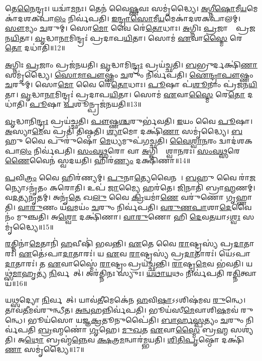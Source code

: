 𑌤𑍇\ul{𑌨𑍈}𑌨𑍍𑌦𑍍𑌰𑌃।
𑌯𑌦𑍍𑌵𑌾॑\ul{𑌮}𑌨𑌃।
𑌤𑍇𑌨॑ 𑌵𑍈\ul{𑌷𑍍𑌣}𑌵𑌃 𑌸𑌮𑍃॑𑌦𑍍𑌧𑍍𑌯𑍈।
\ul{𑌅}\ul{𑌗𑍍𑌨𑍀}\ul{𑌷𑍋}𑌮𑍀\ul{𑌯}𑌮𑍇𑌕𑌾॑\-𑌦𑌶𑌕𑌪𑌾\ul{𑌲𑌂} 𑌨𑌿𑌰𑍍𑌵॑𑌪𑌤𑌿।
\ul{𑌇}\ul{𑌨𑍍𑌦𑍍𑌰𑌾}\ul{𑌸𑍋}𑌮𑍀\ul{𑌯}𑌮𑍇𑌕𑌾॑𑌦𑌶𑌕𑌪𑌾𑌲𑌮𑍍।
\ul{𑌸𑍗}𑌮𑍍𑌯𑌂 \ul{𑌚}𑌰𑍁𑌮𑍍।
𑌸𑍋\ul{𑌮𑍋} 𑌵𑍈 𑌰𑍇॑\ul{𑌤𑍋}𑌧𑌾𑌃।
\ul{𑌅}𑌗𑍍𑌨𑌿𑌃 \ul{𑌪𑍍𑌰}𑌜𑌾𑌨𑌾𑌂᳚ 𑌪𑍍𑌰𑌜𑌨\ul{𑌯𑌿}𑌤𑌾।
\ul{𑌵𑍃}𑌦𑍍𑌧𑌾\ul{𑌨𑌾}𑌮𑌿𑌨𑍍𑌦𑍍𑌰𑌃॑ 𑌪𑍍𑌰𑌦𑌾𑌪\ul{𑌯𑌿}𑌤𑌾।
𑌸𑍋𑌮॑ \ul{𑌏}𑌵𑌾\ul{𑌸𑍍𑌮𑍈} 𑌰𑍇\ul{𑌤𑍋} 𑌦𑌧𑌾॑𑌤𑌿॥12॥

\ul{𑌅}𑌗𑍍𑌨𑌿𑌃 \ul{𑌪𑍍𑌰}𑌜𑌾𑌂 𑌪𑍍𑌰𑌜॑𑌨𑌯𑌤𑌿।
\ul{𑌵𑍃}𑌦𑍍𑌧𑌾𑌮𑌿\ul{𑌨𑍍𑌦𑍍𑌰𑌃} 𑌪𑍍𑌰𑌯॑𑌚𑍍𑌛𑌤𑌿।
\ul{𑌬}𑌭𑍍𑌰𑍁𑌰𑍍𑌦𑌕𑍍𑌷𑌿॑\ul{𑌣𑌾} 𑌸𑌮𑍃॑𑌦𑍍𑌧𑍍𑌯𑍈।
\ul{𑌸𑍋}\ul{𑌮𑌾}\ul{𑌪𑍗}𑌷𑍍𑌣𑌂 \ul{𑌚}𑌰𑍁𑌂 𑌨𑌿𑌰𑍍𑌵॑𑌪𑌤𑌿।
\ul{𑌐}\ul{𑌨𑍍𑌦𑍍𑌰𑌾}\ul{𑌪𑍗}𑌷𑍍𑌣𑌂 \ul{𑌚}𑌰𑍁𑌮𑍍।
𑌸𑍋\ul{𑌮𑍋} 𑌵𑍈 𑌰𑍇॑\ul{𑌤𑍋}𑌧𑌾𑌃।
\ul{𑌪𑍂}𑌷𑌾 𑌪॑\ul{𑌶𑍂}𑌨𑌾𑌂 𑌪𑍍𑌰॑𑌜𑌨\ul{𑌯𑌿}𑌤𑌾।
\ul{𑌵𑍃}𑌦𑍍𑌧𑌾\ul{𑌨𑌾}𑌮𑌿𑌨𑍍𑌦𑍍𑌰𑌃॑ 𑌪𑍍𑌰𑌦𑌾𑌪\ul{𑌯𑌿}𑌤𑌾।
𑌸𑍋𑌮॑ \ul{𑌏}𑌵𑌾\ul{𑌸𑍍𑌮𑍈} 𑌰𑍇\ul{𑌤𑍋} 𑌦𑌧𑌾॑𑌤𑌿।
\ul{𑌪𑍂}𑌷𑌾 \ul{𑌪}𑌶𑍂𑌨𑍍𑌪𑍍𑌰𑌜॑𑌨𑌯𑌤𑌿॥13॥

\ul{𑌵𑍃}𑌦𑍍𑌧𑌾𑌨𑌿\ul{𑌨𑍍𑌦𑍍𑌰𑌃} 𑌪𑍍𑌰𑌯॑𑌚𑍍𑌛𑌤𑌿।
\ul{𑌪𑍗}𑌷𑍍𑌣\ul{𑌶𑍍𑌚}𑌰𑍁𑌰𑍍𑌭॑𑌵𑌤𑌿।
\ul{𑌇}𑌯𑌂 𑌵𑍈 \ul{𑌪𑍂}𑌷𑌾।
\ul{𑌅}𑌸𑍍𑌯𑌾\ul{𑌮𑍇}𑌵 𑌪𑍍𑌰𑌤𑌿॑ 𑌤𑌿𑌷𑍍𑌠𑌤𑌿।
\ul{𑌶𑍍𑌯𑌾}𑌮𑍋 𑌦𑌕𑍍𑌷𑌿॑\ul{𑌣𑌾} 𑌸𑌮𑍃॑𑌦𑍍𑌧𑍍𑌯𑍈।
\ul{𑌬}𑌹𑍁 𑌵𑍈 𑌪𑍁𑌰𑍁॑𑌷𑍋 \ul{𑌮𑍇}𑌧𑍍𑌯𑌮𑍁𑌪॑𑌗𑌚𑍍𑌛𑌤𑌿।
\ul{𑌵𑍈}\ul{𑌶𑍍𑌵𑌾}\ul{𑌨}𑌰𑌂 𑌦𑍍𑌵𑌾𑌦॑𑌶𑌕𑌪𑌾\ul{𑌲𑌂} 𑌨𑌿𑌰𑍍𑌵॑𑌪𑌤𑌿।
\ul{𑌸𑌂}\ul{𑌵}\ul{𑌥𑍍𑌸}𑌰𑍋 𑌵𑌾 \ul{𑌅}𑌗𑍍𑌨𑌿𑌰𑍍𑌵𑍈᳚𑌶𑍍𑌵𑌾\ul{𑌨}𑌰𑌃।
\ul{𑌸𑌂}\ul{𑌵}\ul{𑌥𑍍𑌸}𑌰𑍇\ul{𑌣𑍈}𑌵𑍈𑌨॑ 𑌸𑍍𑌵𑌦𑌯𑌤𑌿।
𑌹𑌿𑌰॑\ul{𑌣𑍍𑌯𑌂} 𑌦𑌕𑍍𑌷𑌿॑𑌣𑌾॥14॥

\ul{𑌪}𑌵𑌿\ul{𑌤𑍍𑌰𑌂} 𑌵𑍈 𑌹𑌿𑌰॑𑌣𑍍𑌯𑌮𑍍।
\ul{𑌪𑍁}𑌨𑌾\ul{𑌤𑍍𑌯𑍇}𑌵𑍈𑌨𑌮𑍍᳚।
\ul{𑌬}𑌹𑍁 𑌵𑍈 𑌰𑌾॑\ul{𑌜}𑌨𑍍𑌯𑍋\-𑌽𑌨𑍃॑𑌤𑌂 𑌕𑌰𑍋𑌤𑌿।
𑌉𑌪॑ \ul{𑌜𑌾}𑌮𑍍𑌯𑍈 𑌹𑌰॑𑌤𑍇।
\ul{𑌜𑌿}𑌨𑌾𑌤𑌿॑ 𑌬𑍍𑌰𑌾\ul{𑌹𑍍𑌮}𑌣𑌮𑍍।
𑌵\ul{𑌦}𑌤𑍍𑌯𑌨𑍃॑𑌤𑌮𑍍।
𑌅𑌨𑍃॑\ul{𑌤𑍇} 𑌖\ul{𑌲𑍁} 𑌵𑍈 \ul{𑌕𑍍𑌰𑌿}𑌯𑌮𑌾॑\ul{𑌣𑍇} 𑌵𑌰𑍁॑𑌣𑍋 𑌗𑍃𑌹𑍍𑌣𑌾𑌤𑌿।
\ul{𑌵𑌾}\ul{𑌰𑍁}𑌣𑌂 𑌯॑\ul{𑌵}𑌮𑌯𑌂॑ \ul{𑌚}𑌰𑍁𑌂 𑌨𑌿𑌰𑍍𑌵॑𑌪𑌤𑌿।
\ul{𑌵}\ul{𑌰𑍁}\ul{𑌣}\ul{𑌪𑌾}𑌶𑌾\ul{𑌦𑍇}𑌵𑍈𑌨𑌂॑ 𑌮𑍁𑌞𑍍𑌚𑌤𑌿।
𑌅\ul{𑌶𑍍𑌵𑍋} 𑌦𑌕𑍍𑌷𑌿॑𑌣𑌾।
\ul{𑌵𑌾}\ul{𑌰𑍁}𑌣𑍋 𑌹𑌿 \ul{𑌦𑍇}𑌵\ul{𑌤}𑌯𑌾\-𑌽\ul{𑌶𑍍𑌵𑌃} 𑌸𑌮𑍃॑𑌦𑍍𑌧𑍍𑌯𑍈॥15॥\anuvakamend[\ul{𑌐}\ul{𑌨𑍍𑌦𑍍𑌰𑌾}\ul{𑌵𑍈}\ul{𑌷𑍍𑌣}𑌵𑌮𑍇𑌕𑌾॑𑌦𑌶𑌕𑌪𑌾\ul{𑌲𑌂} 𑌯𑌦𑍃॑\ul{𑌷}𑌭𑍋 𑌦𑌧𑌾॑𑌤𑌿 \ul{𑌪𑍂}𑌷𑌾 \ul{𑌪}𑌶𑍂𑌨𑍍𑌪𑍍𑌰𑌜॑𑌨𑌯\ul{𑌤𑌿} 𑌹𑌿𑌰॑\ul{𑌣𑍍𑌯𑌂} 𑌦𑌕𑍍𑌷𑌿॑\ul{𑌣𑌾} 𑌦\ul{𑌕𑍍𑌷𑌿}𑌣𑍈𑌕𑌂॑ 𑌚]

\ul{𑌰}𑌤𑍍𑌨𑌿𑌨𑌾॑\ul{𑌮𑍇}𑌤𑌾𑌨𑌿॑ \ul{𑌹}𑌵𑍀𑌷𑌿॑ 𑌭𑌵𑌨𑍍𑌤𑌿।
\ul{𑌏}𑌤𑍇 𑌵𑍈 \ul{𑌰𑌾}𑌷𑍍𑌟𑍍𑌰𑌸𑍍𑌯॑ 𑌪𑍍𑌰\ul{𑌦𑌾}𑌤𑌾𑌰𑌃॑।
\ul{𑌏}𑌤𑍇॑\-𑌽𑌪𑌾\ul{𑌦𑌾}𑌤𑌾𑌰𑌃॑।
𑌯 \ul{𑌏}𑌵 \ul{𑌰𑌾}𑌷𑍍𑌟𑍍𑌰𑌸𑍍𑌯॑ 𑌪𑍍𑌰\ul{𑌦𑌾}𑌤𑌾𑌰𑌃॑।
𑌯𑍇॑𑌽𑌪𑌾\ul{𑌦𑌾}𑌤𑌾𑌰𑌃॑।
𑌤 \ul{𑌏}𑌵𑌾𑌸𑍍𑌮𑍈॑ \ul{𑌰𑌾}𑌷𑍍𑌟𑍍𑌰𑌂 𑌪𑍍𑌰𑌯॑𑌚𑍍𑌛𑌨𑍍𑌤𑌿।
\ul{𑌰𑌾}𑌷𑍍𑌟𑍍𑌰\ul{𑌮𑍇}𑌵 𑌭॑𑌵𑌤𑌿।
𑌯𑌥𑍍𑌸॑\ul{𑌮𑌾}𑌹𑍃𑌤𑍍𑌯॑ \ul{𑌨𑌿}𑌰𑍍𑌵𑌪𑍇᳚𑌤𑍍।
𑌅𑌰॑𑌤𑍍𑌨𑌿𑌨𑌃 𑌸𑍍𑌯𑍁𑌃।
\ul{𑌯}\ul{𑌥𑌾}\ul{𑌯}𑌥𑌂 𑌨𑌿𑌰𑍍𑌵॑𑌪𑌤𑌿 𑌰\ul{𑌤𑍍𑌨𑌿}𑌤𑍍𑌵𑌾𑌯॑॥16॥

𑌯\ul{𑌥𑍍𑌸}𑌦𑍍𑌯𑍋 \ul{𑌨𑌿}𑌰𑍍𑌵𑌪𑍇᳚𑌤𑍍।
𑌯𑌾𑌵॑\ul{𑌤𑍀}𑌮𑍇𑌕𑍇॑𑌨 \ul{𑌹}𑌵𑌿\ul{𑌷𑌾}\-𑌽𑌽𑌶𑌿𑌷॑𑌮𑌵 \ul{𑌰𑍁}𑌨𑍍𑌧𑍇।
𑌤𑌾𑌵॑\ul{𑌤𑍀}𑌮𑌵॑𑌰𑍁𑌨𑍍𑌧𑍀𑌤।
\ul{𑌅}\ul{𑌨𑍍𑌵}𑌹𑌨𑍍𑌨𑌿𑌰𑍍𑌵॑𑌪𑌤𑌿।
𑌭𑍂𑌯॑𑌸𑍀\ul{𑌮𑍇}𑌵𑌾𑌶𑌿\ul{𑌷}𑌮𑌵॑ 𑌰𑍁𑌨𑍍𑌧𑍇।
𑌭𑍂𑌯॑𑌸𑍋 𑌯𑌜𑍍𑌞\ul{𑌕𑍍𑌰}𑌤𑍂𑌨𑍁𑌪𑍈॑𑌤𑌿।
\ul{𑌬𑌾}\ul{𑌰𑍍}\ul{𑌹}\ul{𑌸𑍍𑌪}𑌤𑍍𑌯𑌂 \ul{𑌚}𑌰𑍁𑌂 𑌨𑌿𑌰𑍍𑌵॑𑌪𑌤𑌿 \ul{𑌬𑍍𑌰}𑌹𑍍𑌮𑌣𑍋॑ \ul{𑌗𑍃}𑌹𑍇।
\ul{𑌮𑍁}\ul{𑌖}𑌤 \ul{𑌏}𑌵𑌾\ul{𑌸𑍍𑌮𑍈} 𑌬𑍍𑌰\ul{𑌹𑍍𑌮} 𑌸𑌶𑍍𑌯॑𑌤𑌿।
𑌅\ul{𑌥𑍋} 𑌬𑍍𑌰𑌹𑍍𑌮॑\ul{𑌨𑍍𑌨𑍇}𑌵 \ul{𑌕𑍍𑌷}𑌤𑍍𑌰\ul{𑌮}𑌨𑍍𑌵𑌾𑌰॑𑌮𑍍𑌭𑌯𑌤𑌿।
\ul{𑌶𑌿}\ul{𑌤𑌿}\ul{𑌪𑍃}𑌷𑍍𑌠𑍋 𑌦𑌕𑍍𑌷𑌿॑\ul{𑌣𑌾} 𑌸𑌮𑍃॑𑌦𑍍𑌧𑍍𑌯𑍈॥17॥


